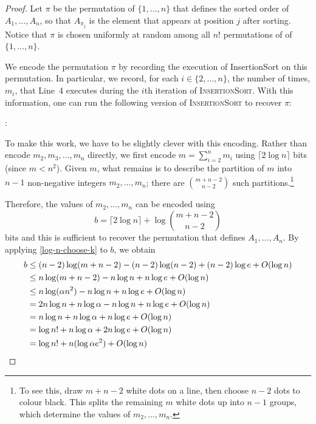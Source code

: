 \documentclass{patmorin}
\begin{document}
\begin{proof}
  Let $\pi$ be the permutation of $\{1,\ldots,n\}$ that defines the sorted
  order of $A_1,\ldots,A_n$, so that $A_{\pi_j}$ is the element that appears
  at position $j$ after sorting. Notice that $\pi$ is chosen uniformly at
  random among all $n!$ permutations of of $\{1,\ldots,n\}$.
  
  We encode the permutation $\pi$ by recording the execution of
  InsertionSort on this permutation. In particular, we record, for each
  $i\in\{2,\ldots,n\}$, the number of times, $m_i$, that Line~4 executes
  during the $i$th iteration of \textsc{InsertionSort}. With this information,
  one can run the following version of \textsc{InsertionSort} to recover $\pi$:
  
  :
  \begin{algorithmic}[1]
       \ENDFOR
    \ENDFOR
  \end{algorithmic}
   
  To make this work, we have to be slightly clever with this
  encoding. Rather than encode $m_2,m_3,\ldots,m_n$ directly, we first
  encode $m=\sum_{i=2}^{n} m_i$ using $\lceil 2\log n\rceil$ bits (since $m < n^2$). Given $m$, what
  remains is to describe the partition of $m$ into $n-1$ non-negative
  integers $m_2,\ldots,m_n$; there are $\binom{m+n-2}{n-2}$ such
  partitions.\footnote{To see this, draw $m+n-2$ white dots on a line,
  then choose $n-2$ dots to colour black. This splits the remaining $m$ white dots
  up into $n-1$ groups, which determine the values of $m_2,\ldots,m_n$.}
  
  Therefore, the values of $m_2,\ldots,m_n$ can be encoded using
  \[
      b = \lceil 2\log n\rceil + \log\binom{m+n-2}{n-2}
  \]
  bits and this is sufficient to recover the permutation that defines
  $A_1,\ldots,A_n$.  By applying \eqref{log-n-choose-k} to $b$, we obtain
  \begin{align*}
    b & \le (n-2)\log(m+n-2) - (n-2)\log(n-2)  + (n-2)\log e + O(\log n) \\
      & \le n\log(m+n-2) - n\log n   + n\log e + O(\log n) \\
      & \le n\log(\alpha n^2) - n\log n  + n\log e + O(\log n) \\
      & = 2n\log n + n\log\alpha - n\log n  + n\log e + O(\log n) \\
      & = n\log n + n\log\alpha + n\log e + O(\log n) \\
      & = \log n! + n\log\alpha + 2n\log e + O(\log n) \\
      & = \log n! + n(\log \alpha e^2) + O(\log n)  \qedhere
  \end{align*}
\end{proof}
\end{document}
